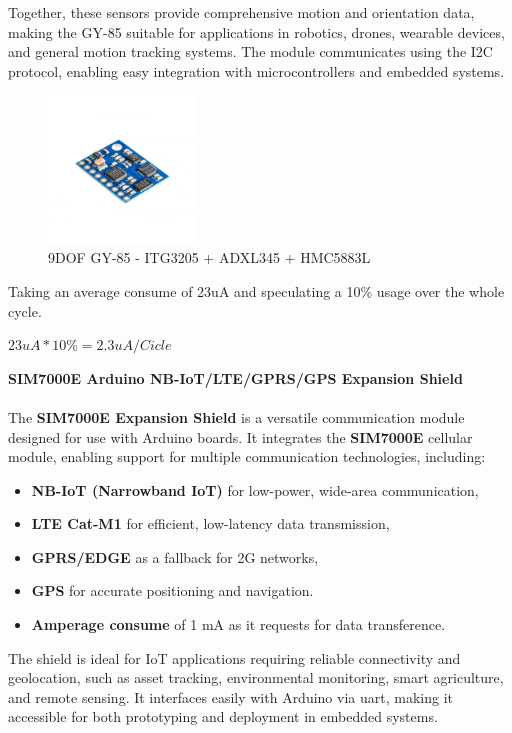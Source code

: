 Together, these sensors provide comprehensive motion and orientation data, 
making the GY-85 suitable for applications in robotics, drones, wearable 
devices, and general motion tracking systems. The module communicates using 
the I2C protocol, enabling easy integration with microcontrollers and 
embedded systems.

\begin{figure}[H]
    \centering
    \includegraphics[width=0.35\textwidth]{images/chapter/design/components/final_IMU.png}  %
    \caption{9DOF GY-85 - ITG3205 + ADXL345 + HMC5883L}
    \label{fig:9DOF GY-85 - ITG3205 + ADXL345 + HMC5883L}        
\end{figure}

Taking an average consume of 23uA and speculating a 10\% usage over the whole cycle.

\( 23uA * 10\% = 2.3uA/Cicle\)

\textbf{SIM7000E Arduino NB-IoT/LTE/GPRS/GPS Expansion Shield}
\\\\
The \textbf{SIM7000E Expansion Shield} is a versatile communication module designed for use with Arduino boards. It integrates the \textbf{SIM7000E} cellular module, enabling support for multiple communication technologies, including:

\begin{itemize}
    \item \textbf{NB-IoT (Narrowband IoT)} for low-power, wide-area communication,
    \item \textbf{LTE Cat-M1} for efficient, low-latency data transmission,
    \item \textbf{GPRS/EDGE} as a fallback for 2G networks,
    \item \textbf{GPS} for accurate positioning and navigation.
    \item \textbf{Amperage consume} of 1 mA as it requests for data transference.
\end{itemize}

The shield is ideal for IoT applications requiring reliable connectivity and 
geolocation, such as asset tracking, environmental monitoring, smart 
agriculture, and remote sensing. It interfaces easily with Arduino via \acrshort{uart}, 
making it accessible for both prototyping and deployment in embedded systems.

